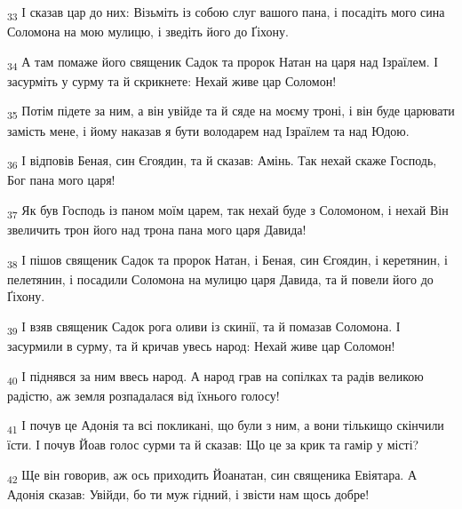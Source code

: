 \begin{tcolorbox}
\textsubscript{33} І сказав цар до них: Візьміть із собою слуг вашого пана, і посадіть мого сина Соломона на мою мулицю, і зведіть його до Ґіхону.
\end{tcolorbox}
\begin{tcolorbox}
\textsubscript{34} А там помаже його священик Садок та пророк Натан на царя над Ізраїлем. І засурміть у сурму та й скрикнете: Нехай живе цар Соломон!
\end{tcolorbox}
\begin{tcolorbox}
\textsubscript{35} Потім підете за ним, а він увійде та й сяде на моєму троні, і він буде царювати замість мене, і йому наказав я бути володарем над Ізраїлем та над Юдою.
\end{tcolorbox}
\begin{tcolorbox}
\textsubscript{36} І відповів Беная, син Єгоядин, та й сказав: Амінь. Так нехай скаже Господь, Бог пана мого царя!
\end{tcolorbox}
\begin{tcolorbox}
\textsubscript{37} Як був Господь із паном моїм царем, так нехай буде з Соломоном, і нехай Він звеличить трон його над трона пана мого царя Давида!
\end{tcolorbox}
\begin{tcolorbox}
\textsubscript{38} І пішов священик Садок та пророк Натан, і Беная, син Єгоядин, і керетянин, і пелетянин, і посадили Соломона на мулицю царя Давида, та й повели його до Ґіхону.
\end{tcolorbox}
\begin{tcolorbox}
\textsubscript{39} І взяв священик Садок рога оливи із скинії, та й помазав Соломона. І засурмили в сурму, та й кричав увесь народ: Нехай живе цар Соломон!
\end{tcolorbox}
\begin{tcolorbox}
\textsubscript{40} І піднявся за ним ввесь народ. А народ грав на сопілках та радів великою радістю, аж земля розпадалася від їхнього голосу!
\end{tcolorbox}
\begin{tcolorbox}
\textsubscript{41} І почув це Адонія та всі покликані, що були з ним, а вони тількищо скінчили їсти. І почув Йоав голос сурми та й сказав: Що це за крик та гамір у місті?
\end{tcolorbox}
\begin{tcolorbox}
\textsubscript{42} Ще він говорив, аж ось приходить Йоанатан, син священика Евіятара. А Адонія сказав: Увійди, бо ти муж гідний, і звісти нам щось добре!
\end{tcolorbox}
